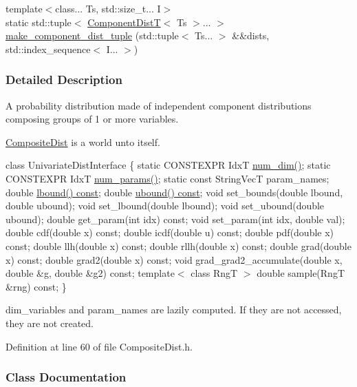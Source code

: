 \begin{DoxyCompactItemize}
\item 
{\footnotesize template$<$class... Ts, std\+::size\+\_\+t... I$>$ }\\static std\+::tuple$<$ \hyperlink{classprior__hessian_1_1CompositeDist_ab9b58a9ef851c7d5453273785d915c34}{Component\+DistT}$<$ Ts $>$... $>$ \hyperlink{classprior__hessian_1_1CompositeDist_a44c6ec3b0e740206e737f707378600c8}{make\+\_\+component\+\_\+dist\+\_\+tuple} (std\+::tuple$<$ Ts... $>$ \&\&dists, std\+::index\+\_\+sequence$<$ I... $>$)
\end{DoxyCompactItemize}


\subsubsection{Detailed Description}
A probability distribution made of independent component distributions composing groups of 1 or more variables. 

\hyperlink{classprior__hessian_1_1CompositeDist}{Composite\+Dist} is a world unto itself.

class Univariate\+Dist\+Interface \{ static C\+O\+N\+S\+T\+E\+X\+PR IdxT \hyperlink{classprior__hessian_1_1CompositeDist_ad532e3fe9e7293fef7b293d3c94a1ddc}{num\+\_\+dim()}; static C\+O\+N\+S\+T\+E\+X\+PR IdxT \hyperlink{classprior__hessian_1_1CompositeDist_ae7742f32d7e64ca2c7b55132a8ae6895}{num\+\_\+params()}; static const String\+VecT param\+\_\+names; double \hyperlink{classprior__hessian_1_1CompositeDist_a46c83acc63b87837f3c4cb425e312d67}{lbound() const}; double \hyperlink{classprior__hessian_1_1CompositeDist_aab0290d9dd418c2e7deb26e9f37eb74f}{ubound() const}; void set\+\_\+bounds(double lbound, double ubound); void set\+\_\+lbound(double lbound); void set\+\_\+ubound(double ubound); double get\+\_\+param(int idx) const; void set\+\_\+param(int idx, double val); double cdf(double x) const; double icdf(double u) const; double pdf(double x) const; double llh(double x) const; double rllh(double x) const; double grad(double x) const; double grad2(double x) const; void grad\+\_\+grad2\+\_\+accumulate(double x, double \&g, double \&g2) const; template$<$ class Rng\+T $>$ double sample(\+Rng\+T \&rng) const; \}

dim\+\_\+variables and param\+\_\+names are lazily computed. If they are not accessed, they are not created. 

Definition at line 60 of file Composite\+Dist.\+h.



\subsubsection{Class Documentation}
\label{classprior__hessian_1_1CompositeDist_1_1ComponentDistAdaptor}
\hypertarget{classprior__hessian_1_1CompositeDist_classprior__hessian_1_1CompositeDist_1_1ComponentDistAdaptor}{}
